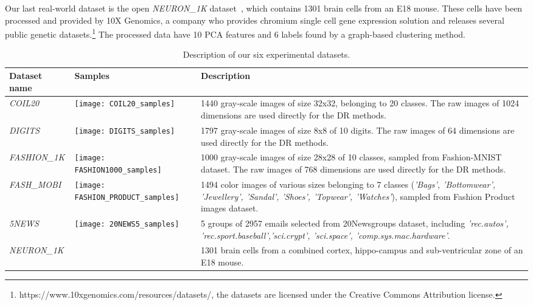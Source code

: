 Our last real-world dataset is the open \emph{NEURON\_1K} dataset~\cite{neuron1k}, which contains 1301 brain cells from an E18 mouse. These cells have been processed and provided by 10X Genomics, a company who provides chromium single cell gene expression solution and releases several public genetic datasets.\footnote{https://www.10xgenomics.com/resources/datasets/, the datasets are licensed under the Creative Commons Attribution license.}
The processed data have 10 PCA features and 6 labels found by a graph-based clustering method.


\begin{table*}%
\caption{Description of our six experimental datasets.}\label{tbl:dataset}
\begin{tabular}{m{2.2cm} m{5.4cm} m{7.4cm}}
\toprule
Dataset name & Samples & Description \\
\midrule

\emph{COIL20}
    & \texttt{[image: COIL20\_samples]}
    & 1440 gray-scale images of size 32x32, belonging to 20 classes.
    The raw images of 1024 dimensions are used directly for the DR methods.\\

\emph{DIGITS}
    & \texttt{[image: DIGITS\_samples]}
    & 1797 gray-scale images of size 8x8 of 10 digits.
    The raw images of 64 dimensions are used directly for the DR methods.\\

\emph{FASHION\_1K}
    & \texttt{[image: FASHION1000\_samples]}
    & 1000 gray-scale images of size 28x28 of 10 classes, sampled from Fashion-MNIST dataset.
    The raw images of 768 dimensions are used directly for the DR methods.\\

\emph{FASH\_MOBI}
    & \texttt{[image: FASHION\_PRODUCT\_samples]}
    & 1494 color images of various sizes belonging to 7 classes
    (\emph{'Bags', 'Bottomwear', 'Jewellery', 'Sandal', 'Shoes', 'Topwear', 'Watches'}),
    sampled from Fashion Product images dataset.\\

\emph{5NEWS}
    & \texttt{[image: 20NEWS5\_samples]}
    & 5 groups of 2957 emails selected from 20Newsgroups dataset,
    including \emph{'rec.autos', 'rec.sport.baseball','sci.crypt', 'sci.space', 'comp.sys.mac.hardware'}. \\

\emph{NEURON\_1K}
    &
    & 1301 brain cells from a combined cortex, hippo-campus and sub-ventricular zone of an E18 mouse. \\

\bottomrule
\end{tabular}
\end{table*}

